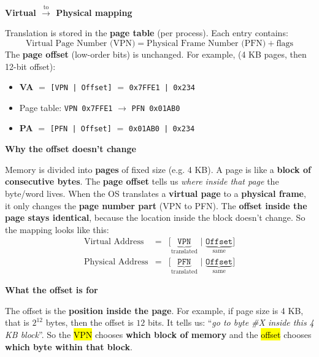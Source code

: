 \begin{remarkbox}
    \highspace
    \begin{flushleft}
        \textcolor{Green3}{ \textbf{Virtual $\xrightarrow{\text{to}}$ Physical mapping}}
    \end{flushleft}
    Translation is stored in the \textbf{page table} (per process). Each entry contains:
    \begin{equation*}
        \text{Virtual Page Number (VPN)} = \text{Physical Frame Number (PFN)} + \text{flags}
    \end{equation*}
    The \textbf{page offset} (low-order bits) is unchanged. For example, (4 KB pages, then 12-bit offset):
    \begin{itemize}
        \item \textbf{VA} $=$ \texttt{[VPN | Offset]} $=$ \texttt{0x7FFE1 | 0x234}
        \item Page table: \texttt{VPN 0x7FFE1} $\rightarrow$ \texttt{PFN 0x01AB0}
        \item \textbf{PA} $=$ \texttt{[PFN | Offset]} $=$ \texttt{0x01AB0 | 0x234}
    \end{itemize}

    \newpage

    \begin{flushleft}
        \textcolor{Green3}{ \textbf{Why the offset doesn't change}}
    \end{flushleft}
    Memory is divided into \textbf{pages} of fixed size (e.g. 4 KB). A page is like a \textbf{block of consecutive bytes}. The \textbf{page offset} tells us \emph{where inside that page} the byte/word lives. When the OS translates a \textbf{virtual page} to a \textbf{physical frame}, it only changes the \textbf{page number part} (VPN to PFN). The \textbf{offset inside the page stays identical}, because the location inside the block doesn't change. So the mapping looks like this:
    \begin{equation*}
        \begin{array}{rcl}
            \text{Virtual Address}  &=& \texttt{[}\underbrace{\texttt{VPN}}_{\text{translated}}\texttt{ | }\underbrace{\texttt{Offset}}_{\text{same}}\texttt{]} \\ [1.3em]
            \text{Physical Address} &=& \texttt{[}\underbrace{\texttt{PFN}}_{\text{translated}}\texttt{ | }\underbrace{\texttt{Offset}}_{\text{same}}\texttt{]}
        \end{array}
    \end{equation*}

    \highspace
    \begin{flushleft}
        \textcolor{Green3}{ \textbf{What the offset is for}}
    \end{flushleft}
    The offset is the \textbf{position inside the page}. For example, if page size is 4 KB, that is $2^{12}$ bytes, then the offset is $12$ bits. It tells us: ``\emph{go to byte \#X inside this 4 KB block}''. So the \hl{VPN} chooses \textbf{which block of memory} and the \hl{offset} chooses \textbf{which byte within that block}.


\end{remarkbox}
